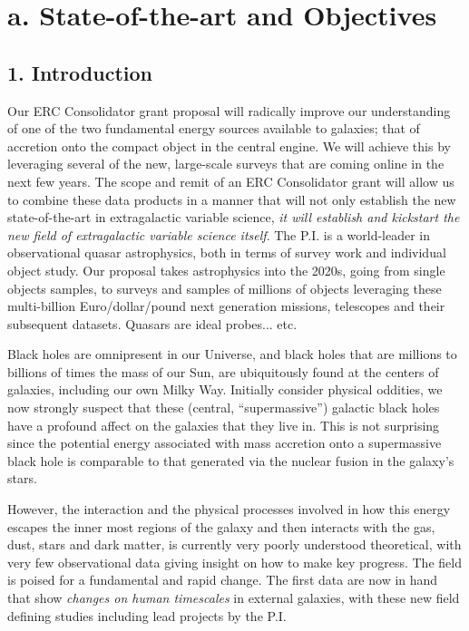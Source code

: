 
\section*{a. State-of-the-art and Objectives}

\subsection*{1. Introduction}
\smallskip
\noindent
Our ERC Consolidator grant proposal will radically improve our understanding of 
one of the two fundamental energy sources available to galaxies; that of accretion 
onto the compact object in the central engine. We will achieve this by leveraging 
several of the new, large-scale surveys that are coming online in the next few years. 
The scope and remit of an ERC Consolidator grant will allow us to combine these 
data products in a manner that will 
not only establish the new state-of-the-art in extragalactic variable science, 
{\it it will establish and kickstart the new field of extragalactic variable science itself}. 
The P.I. is a world-leader in observational quasar astrophysics, both in terms of 
survey work and individual object study. 
Our proposal takes astrophysics into the 2020s, going from single objects samples, 
to surveys and samples of millions of objects leveraging these multi-billion Euro/dollar/pound  
next generation missions, telescopes and their subsequent datasets. 
Quasars are ideal probes... etc. 

\smallskip
\smallskip
\noindent
Black holes are omnipresent in our Universe, and black holes that are
millions to billions of times the mass of our Sun, are ubiquitously
found at the centers of galaxies, including our own Milky Way.
Initially consider physical oddities, we now strongly suspect that
these (central, ``supermassive'') galactic black holes have a profound
affect on the galaxies that they live in. This is not surprising since
the potential energy associated with mass accretion onto a
supermassive black hole is comparable to that generated via the
nuclear fusion in the galaxy's stars.

\smallskip
\smallskip
\noindent
However, the interaction and the physical processes involved in how
this energy escapes the inner most regions of the galaxy and then
interacts with the gas, dust, stars and dark matter, is currently very
poorly understood theoretical, with very few observational data giving
insight on how to make key progress.
%
The field is poised for a fundamental and rapid change. The first data are now in hand 
that show {\it changes on human timescales} in external galaxies, with these new 
field defining studies including lead projects by the P.I. 

